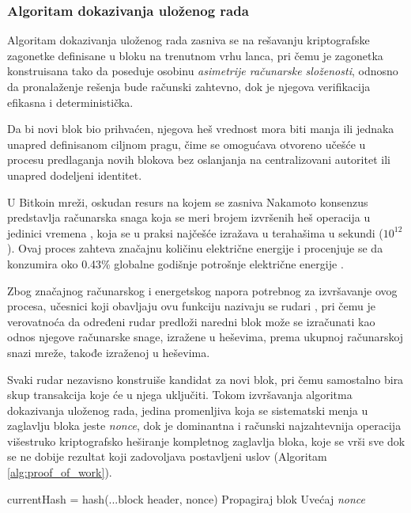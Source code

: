 \subsubsection{Algoritam dokazivanja uloženog rada}
Algoritam dokazivanja uloženog rada  zasniva se na rešavanju kriptografske zagonetke definisane u bloku na trenutnom vrhu lanca, pri čemu je zagonetka konstruisana tako da poseduje osobinu \textit{asimetrije računarske složenosti}, odnosno da pronalaženje rešenja bude računski zahtevno, dok je njegova verifikacija efikasna i deterministička.

Da bi novi blok bio prihvaćen, njegova heš vrednost mora biti manja ili jednaka unapred definisanom ciljnom pragu, čime se omogućava otvoreno učešće u procesu predlaganja novih blokova bez oslanjanja na centralizovani autoritet ili unapred dodeljeni identitet.

U Bitkoin mreži, oskudan resurs na kojem se zasniva Nakamoto konsenzus predstavlja računarska snaga koja se meri brojem izvršenih heš operacija u jedinici vremena , koja se u praksi najčešće izražava u terahašima u sekundi ($10^{12}$). Ovaj proces zahteva značajnu količinu električne energije i procenjuje se da konzumira oko 0.43\% globalne godišnje potrošnje električne energije \cite{kaneko2025comparing}. 

Zbog značajnog računarskog i energetskog napora potrebnog za izvršavanje ovog procesa, učesnici koji obavljaju ovu funkciju nazivaju se rudari , pri čemu je verovatnoća da određeni rudar predloži naredni blok može se izračunati kao odnos njegove računarske snage, izražene u heševima, prema ukupnoj računarskoj snazi mreže, takođe izraženoj u heševima.

Svaki rudar nezavisno konstruiše kandidat za novi blok, pri čemu samostalno bira skup transakcija koje će u njega uključiti. Tokom izvršavanja algoritma dokazivanja uloženog rada, jedina promenljiva koja se sistematski menja u zaglavlju bloka jeste \textit{nonce}, dok je dominantna i računski najzahtevnija operacija višestruko kriptografsko heširanje kompletnog zaglavlja bloka, koje se vrši sve dok se ne dobije rezultat koji zadovoljava postavljeni uslov (Algoritam \ref{alg:proof_of_work}). 

\begin{algorithm}
\caption{Proces rudarenja}
\label{alg:proof_of_work}
\begin{algorithmic}[1]
    \State currentHash = hash(...block header, nonce)
        \State Propagiraj blok
    \Else
        \State Uvećaj \textit{nonce}
    \EndIf
\EndWhile
\end{algorithmic}
\end{algorithm}

